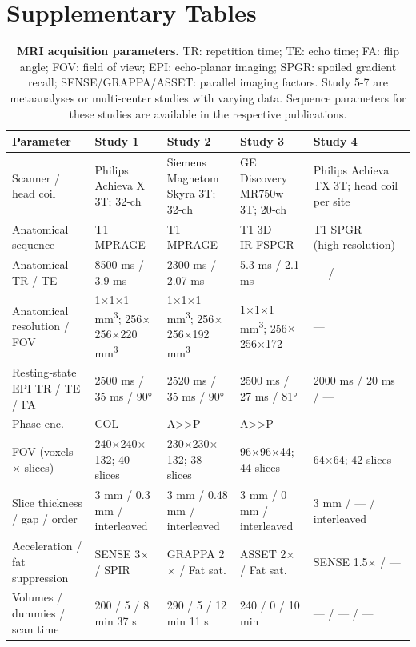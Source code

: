 \documentclass{article}
\begin{document}
\section{Supplementary Tables}

\begin{table}
\centering
\caption[]{\textbf{MRI acquisition parameters.} TR: repetition time; TE: echo time; FA: flip angle; FOV: field of view; EPI: echo‑planar imaging; SPGR: spoiled gradient recall; SENSE/GRAPPA/ASSET: parallel imaging factors. Study 5-7 are metaanalyses or multi-center studies with varying data. Sequence parameters for these studies are available in the respective publications.}
\label{si-tab-mri}
\begin{tabular}{p{}p{}p{}p{}p{}}
\toprule
Parameter & Study 1 & Study 2 & Study 3 & Study 4 \\
\hline
Scanner / head coil & Philips Achieva X 3T; 32‑ch & Siemens Magnetom Skyra 3T; 32‑ch & GE Discovery MR750w 3T; 20‑ch & Philips Achieva TX 3T; head coil per site \\
Anatomical sequence & T1 MPRAGE & T1 MPRAGE & T1 3D IR‑FSPGR & T1 SPGR (high‑resolution) \\
Anatomical TR / TE & 8500 ms / 3.9 ms & 2300 ms / 2.07 ms & 5.3 ms / 2.1 ms & --- / --- \\
Anatomical resolution / FOV & 1$\times$1$\times$1 mm\textsuperscript{3}; 256$\times$256$\times$220 mm\textsuperscript{3} & 1$\times$1$\times$1 mm\textsuperscript{3}; 256$\times$256$\times$192 mm\textsuperscript{3} & 1$\times$1$\times$1 mm\textsuperscript{3}; 256$\times$256$\times$172 & --- \\
Resting‑state EPI TR / TE / FA & 2500 ms / 35 ms / 90° & 2520 ms / 35 ms / 90° & 2500 ms / 27 ms / 81° & 2000 ms / 20 ms / --- \\
Phase enc. & COL & A\textgreater \textgreater P & A\textgreater \textgreater P & --- \\
FOV (voxels $\times$ slices) & 240$\times$240$\times$132; 40 slices & 230$\times$230$\times$132; 38 slices & 96$\times$96$\times$44; 44 slices & 64$\times$64; 42 slices \\
Slice thickness / gap / order & 3 mm / 0.3 mm / interleaved & 3 mm / 0.48 mm / interleaved & 3 mm / 0 mm / interleaved & 3 mm / --- / interleaved \\
Acceleration / fat suppression & SENSE 3$\times$ / SPIR & GRAPPA 2$\times$ / Fat sat. & ASSET 2$\times$ / Fat sat. & SENSE 1.5$\times$ / --- \\
Volumes / dummies / scan time & 200 / 5 / 8 min 37 s & 290 / 5 / 12 min 11 s & 240 / 0 / 10 min & --- / --- / --- \\
\bottomrule
\end{tabular}
\end{table}
\end{document}
